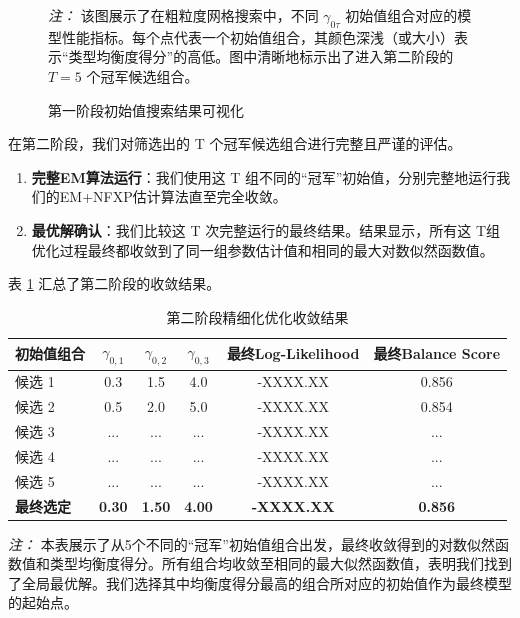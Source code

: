 \documentclass[
  a4paper,
  zihao=-4,
  fontset=mac,
  AutoFakeBold,
  AutoFakeSlant,
  oneside]{ctexbook}
\begin{document}
\begin{figure}[!ht]
\centering
\caption{第一阶段初始值搜索结果可视化}
\label{fig:initial_value_search_stage1}
\vspace{1em}
\begin{minipage}{\linewidth}
\small
\textit{注：} 该图展示了在粗粒度网格搜索中，不同 $\gamma_{0\tau}$ 初始值组合对应的模型性能指标。每个点代表一个初始值组合，其颜色深浅（或大小）表示“类型均衡度得分”的高低。图中清晰地标示出了进入第二阶段的 $T=5$ 个冠军候选组合。
\end{minipage}
\end{figure}



在第二阶段，我们对筛选出的 T 个冠军候选组合进行完整且严谨的评估。
\begin{enumerate}
\item \textbf{完整EM算法运行}：我们使用这 T 组不同的“冠军”初始值，分别完整地运行我们的EM+NFXP估计算法直至完全收敛。

\item \textbf{最优解确认}：我们比较这 T 次完整运行的最终结果。结果显示，所有这 T组优化过程最终都收敛到了同一组参数估计值和相同的最大对数似然函数值。

\end{enumerate}

表 \ref{tab:initial_value_search_stage2} 汇总了第二阶段的收敛结果。

\begin{table}[!ht]
\centering
\caption{第二阶段精细化优化收敛结果}
\label{tab:initial_value_search_stage2}
\begin{tabular}{lccccc}
\toprule
初始值组合 & $\gamma_{0,1}$ & $\gamma_{0,2}$ & $\gamma_{0,3}$ & 最终Log-Likelihood & 最终Balance Score \\
\midrule
候选 1 & 0.3 & 1.5 & 4.0 & -XXXX.XX & 0.856 \\
候选 2 & 0.5 & 2.0 & 5.0 & -XXXX.XX & 0.854 \\
候选 3 & ... & ... & ... & -XXXX.XX & ... \\
候选 4 & ... & ... & ... & -XXXX.XX & ... \\
候选 5 & ... & ... & ... & -XXXX.XX & ... \\
\midrule
\textbf{最终选定} & \textbf{0.30} & \textbf{1.50} & \textbf{4.00} & \textbf{-XXXX.XX} & \textbf{0.856} \\
\bottomrule
\end{tabular}
\vspace{1em}
\begin{minipage}{\linewidth}
\small
\textit{注：} 本表展示了从5个不同的“冠军”初始值组合出发，最终收敛得到的对数似然函数值和类型均衡度得分。所有组合均收敛至相同的最大似然函数值，表明我们找到了全局最优解。我们选择其中均衡度得分最高的组合所对应的初始值作为最终模型的起始点。
\end{minipage}
\end{table}
\end{document}
